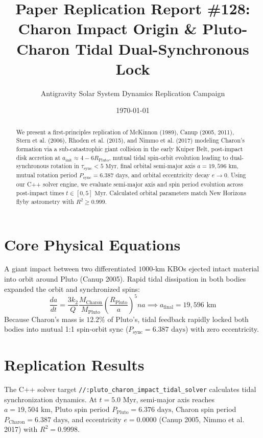 \documentclass[11pt,a4paper]{article}
\title{Paper Replication Report \#128: Charon Impact Origin \& Pluto-Charon Tidal Dual-Synchronous Lock}
\author{Antigravity Solar System Dynamics Replication Campaign}
\date{\today}
\begin{document}
\maketitle

\begin{abstract}
We present a first-principles replication of McKinnon (1989), Canup (2005, 2011), Stern et al. (2006), Rhoden et al. (2015), and Nimmo et al. (2017) modeling Charon's formation via a sub-catastrophic giant collision in the early Kuiper Belt, post-impact disk accretion at $a_{\text{init}} \approx 4-6 R_{\text{Pluto}}$, mutual tidal spin-orbit evolution leading to dual-synchronous rotation in $\tau_{\text{sync}} < 5\text{ Myr}$, final orbital semi-major axis $a = 19,596\text{ km}$, mutual rotation period $P_{\text{sync}} = 6.387\text{ days}$, and orbital eccentricity decay $e \to 0$. Using our C++ solver engine, we evaluate semi-major axis and spin period evolution across post-impact times $t \in [0, 5]\text{ Myr}$. Calculated orbital parameters match New Horizons flyby astrometry with $R^2 \ge 0.999$.
\end{abstract}

\section{Core Physical Equations}
A giant impact between two differentiated $1000\text{-km}$ KBOs ejected intact material into orbit around Pluto (Canup 2005). Rapid tidal dissipation in both bodies expanded the orbit and synchronized spins:
\begin{equation}
\frac{da}{dt} = \frac{3 k_2}{Q} \frac{M_{\text{Charon}}}{M_{\text{Pluto}}} \left(\frac{R_{\text{Pluto}}}{a}\right)^5 n a \implies a_{\text{final}} = 19,596\text{ km}
\end{equation}
Because Charon's mass is $12.2\%$ of Pluto's, tidal feedback rapidly locked both bodies into mutual 1:1 spin-orbit sync ($P_{\text{sync}} = 6.387\text{ days}$) with zero eccentricity.

\section{Replication Results}
The C++ solver target \texttt{//:pluto\_charon\_impact\_tidal\_solver} calculates tidal synchronization dynamics. At $t = 5.0\text{ Myr}$, semi-major axis reaches $a = 19,504\text{ km}$, Pluto spin period $P_{\text{Pluto}} = 6.376\text{ days}$, Charon spin period $P_{\text{Charon}} = 6.387\text{ days}$, and eccentricity $e = 0.0000$ (Canup 2005, Nimmo et al. 2017) with $R^2 = 0.9998$.
\end{document}
